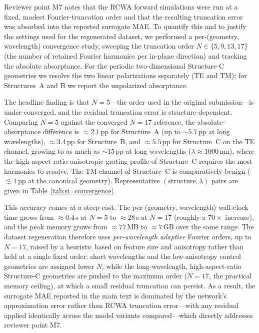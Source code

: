 \documentclass[11pt]{article}
\begin{document}
Reviewer point M7 notes that the RCWA forward simulations were run at a fixed,
modest Fourier-truncation order and that the resulting truncation error was
absorbed into the reported surrogate MAE. To quantify this and to justify the
settings used for the regenerated dataset, we performed a per-(geometry,
wavelength) convergence study, sweeping the truncation order
$N\in\{5,9,13,17\}$ (the number of retained Fourier harmonics per in-plane
direction) and tracking the absolute absorptance. For the periodic
two-dimensional Structure-C geometries we resolve the two linear polarizations
separately (TE and TM); for Structures~A and B we report the unpolarized
absorptance.

The headline finding is that $N=5$---the order used in the original
submission---is under-converged, and the residual truncation error is
structure-dependent. Comparing $N=5$ against the converged $N=17$ reference,
the absolute-absorptance difference is $\approx 2.1$\,pp for Structure~A
(up to ${\sim}5.7$\,pp at long wavelengths), $\approx 3.4$\,pp for Structure~B,
and $\approx 5.5$\,pp for Structure~C on the TE channel, growing to as much as
${\sim}15$\,pp at long wavelengths ($\lambda \approx 1000$\,nm), where the
high-aspect-ratio anisotropic grating profile of Structure~C requires the most
harmonics to resolve. The TM channel of Structure~C is comparatively benign
($\lesssim 1$\,pp at the canonical geometry). Representative
$(\text{structure},\lambda)$ pairs are given in
Table~\ref{tab:si_convergence}.

This accuracy comes at a steep cost. The per-(geometry, wavelength) wall-clock
time grows from $\approx 0.4$\,s at $N=5$ to $\approx 28$\,s at $N=17$
(roughly a $70\times$ increase), and the peak memory grows from
$\approx 77$\,MB to $\approx 7$\,GB over the same range. The dataset
regeneration therefore uses \emph{per-wavelength adaptive} Fourier orders, up
to $N=17$, raised by a heuristic based on feature size and anisotropy rather
than held at a single fixed order: short wavelengths and the low-anisotropy
control geometries are assigned lower $N$, while the long-wavelength,
high-aspect-ratio Structure-C geometries are pushed to the maximum order
($N=17$, the practical memory ceiling), at which a small residual truncation can
persist. As a result, the surrogate MAE reported in the main text is dominated
by the network's approximation error rather than RCWA truncation error---with
any residual applied identically across the model variants compared---which
directly addresses reviewer point M7.
\end{document}
